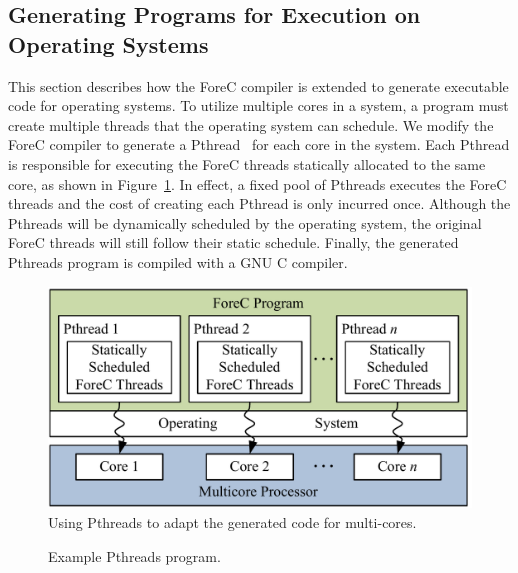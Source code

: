 \subsection{Generating Programs for Execution on Operating Systems}
\label{sec:forec_compiling:posix}
This section describes how the ForeC compiler is extended to
generate executable code for operating systems. 
To utilize multiple cores in a system, a program
must create multiple threads that the operating system can 
schedule. We modify the ForeC compiler to generate a 
Pthread~\cite{multiprocessor_pthreads} for each core in the system. Each
Pthread is responsible for executing the ForeC threads
statically allocated to the same core, as shown in
Figure~\ref{fig:forec_compiling:os}. In effect, a fixed pool of
Pthreads executes the ForeC threads and the cost of creating
each Pthread is only incurred once. Although the
Pthreads will be dynamically scheduled by the operating
system, the original ForeC threads will still follow their
static schedule. Finally, the generated 
Pthreads program is compiled with a GNU C compiler.

\begin{figure}
	\centering

	\includegraphics[width=0.7\columnwidth]{images/compilation_os.pdf}

	\caption{Using Pthreads to adapt the generated code for multi-cores.}
	\label{fig:forec_compiling:os}
\end{figure}

\begin{figure}
	\centering

	\begin{minipage}{0.85\columnwidth}
		
	\end{minipage}

	\caption{Example Pthreads program.}
	\label{fig:forec_compiling:example:c:desktop}
\end{figure}

